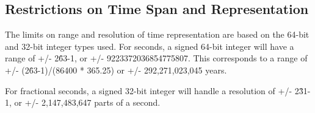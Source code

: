 
\subsection{Restrictions on Time Span and Representation}

The limits on range and resolution of time representation are based on the
64-bit and 32-bit integer types used.  For seconds, a signed 64-bit integer
will have a range of +/- 2\^63-1, or +/- 9223372036854775807.  This corresponds
to a range of +/- (2\^63-1)/(86400 * 365.25) or +/- 292,271,023,045 years.

For fractional seconds, a signed 32-bit integer will handle a resolution of
+/- 2\^31-1, or +/- 2,147,483,647 parts of a second.




